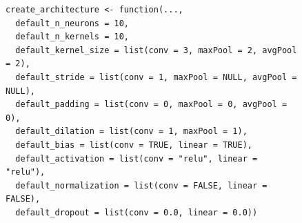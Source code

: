 \documentclass[12pt,twoside]{scrreport}
\begin{document}
\begin{figure}[h]
	\centering
	\newsavebox{\lstbox} %
	\begin{lrbox}{\lstbox}
		\begin{lstlisting}
create_architecture <- function(...,
  default_n_neurons = 10,
  default_n_kernels = 10,
  default_kernel_size = list(conv = 3, maxPool = 2, avgPool = 2),
  default_stride = list(conv = 1, maxPool = NULL, avgPool = NULL),
  default_padding = list(conv = 0, maxPool = 0, avgPool = 0),
  default_dilation = list(conv = 1, maxPool = 1),
  default_bias = list(conv = TRUE, linear = TRUE),
  default_activation = list(conv = "relu", linear = "relu"),
  default_normalization = list(conv = FALSE, linear = FALSE),
  default_dropout = list(conv = 0.0, linear = 0.0))
		\end{lstlisting}
	\end{lrbox}
	\resizebox{\textwidth}{!}{\usebox{\lstbox}}
\end{figure}
\end{document}
